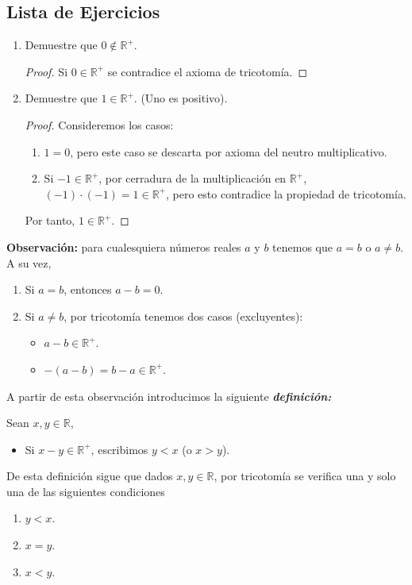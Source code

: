 \documentclass[11pt]{article}
\newcommand{\R}{\mathbb{R}}
\newcommand{\bfit}[1]{\textbf{\textit{#1}}}
\begin{document}
\subsection*{Lista de Ejercicios}
\begin{enumerate}[label=\alph*)]
 \item Demuestre que $0\notin \R^+$.
 \begin{proof} 
 Si $0\in \R^+$ se contradice el axioma de tricotomía.
 \end{proof}

 \item Demuestre que $1\in \R^+$. (Uno es positivo).
 \begin{proof} Consideremos los casos: \begin{enumerate}[label=\roman*)]
 \item $1=0$, pero este caso se descarta por axioma del neutro multiplicativo.
 \item Si $-1\in \R^+$, por cerradura de la multiplicación en $\R^+$, $(-1) \cdot (-1)=1\in \R^+$, pero esto contradice la propiedad de tricotomía.
 \end{enumerate} Por tanto, $1\in \R^+$.
 \end{proof}
\end{enumerate}

\textbf{Observación:} para cualesquiera números reales $a$ y $b$ tenemos que $a=b$ o $a\neq b$. A su vez, \begin{enumerate}[label=\roman*)]
\item Si $a=b$, entonces $a-b=0$.
\item Si $a\neq b$, por tricotomía tenemos dos casos (excluyentes):\begin{itemize}
 \item $a-b\in \R^+$.%
 \item $-(a-b)=b-a\in \R^+$.%
\end{itemize}%
\end{enumerate}

A partir de esta observación introducimos la siguiente \bfit{definición:}

Sean $x,y\in \R$, \begin{itemize}
 \item Si $x-y\in \R^+$, escribimos $y<x$ (o $x>y$).
\end{itemize}

De esta definición sigue que dados $x,y\in \R$, por tricotomía se verifica una y solo una de las siguientes condiciones\vspace{-1em} \begin{enumerate}[label=\roman*)]
 \item $y<x$.
 \item $x=y$.
 \item $x<y$.
\end{enumerate}
\end{document}

